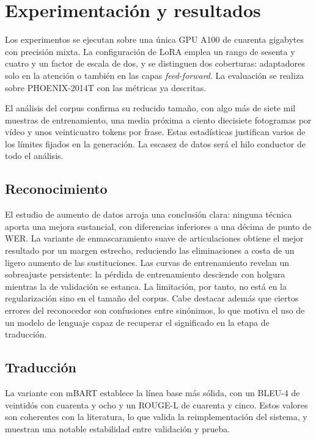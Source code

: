 \documentclass[11pt]{article}
\begin{document}
\section{Experimentación y resultados}

Los experimentos se ejecutan sobre una única GPU A100 de cuarenta gigabytes con precisión mixta. La configuración de LoRA emplea un rango de sesenta y cuatro y un factor de escala de dos, y se distinguen dos coberturas: adaptadores solo en la atención o también en las capas \textit{feed-forward}. La evaluación se realiza sobre PHOENIX-2014T con las métricas ya descritas.

El análisis del corpus confirma su reducido tamaño, con algo más de siete mil muestras de entrenamiento, una media próxima a ciento diecisiete fotogramas por vídeo y unos veinticuatro tokens por frase. Estas estadísticas justifican varios de los límites fijados en la generación. La escasez de datos será el hilo conductor de todo el análisis.

\subsection{Reconocimiento}

El estudio de aumento de datos arroja una conclusión clara: ninguna técnica aporta una mejora sustancial, con diferencias inferiores a una décima de punto de WER. La variante de enmascaramiento suave de articulaciones obtiene el mejor resultado por un margen estrecho, reduciendo las eliminaciones a costa de un ligero aumento de las sustituciones. Las curvas de entrenamiento revelan un sobreajuste persistente: la pérdida de entrenamiento desciende con holgura mientras la de validación se estanca. La limitación, por tanto, no está en la regularización sino en el tamaño del corpus. Cabe destacar además que ciertos errores del reconocedor son confusiones entre sinónimos, lo que motiva el uso de un modelo de lenguaje capaz de recuperar el significado en la etapa de traducción.

\subsection{Traducción}

La variante con mBART establece la línea base más sólida, con un BLEU-4 de veintidós con cuarenta y ocho y un ROUGE-L de cuarenta y cinco. Estos valores son coherentes con la literatura, lo que valida la reimplementación del sistema, y muestran una notable estabilidad entre validación y prueba.
\end{document}
